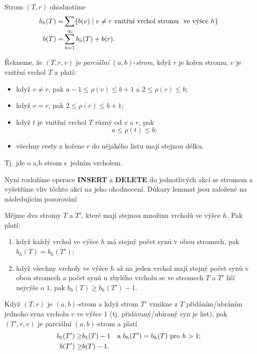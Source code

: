 \documentclass[a4paper,12pt]{article}
\begin{document}
\begin{definice}
Strom $(T,r)$ ohodnotíme 
\begin{align*} b_h(T)=&\sum \{b(v)\mid v\ne r\text{\rm\ vnitřní vrchol stromu }\text{\rm\ ve výšce }
h\}\\
b(T)=&\sum_{h=1}^{\infty}b_h(T)+b(r).\end{align*}
\end{definice}

\begin{definice}

Řekneme, že $(T,r,v)$ je \emph{parciální} 
$(a,b)$-\emph{strom}, když $r$ je kořen stromu, $v$ je vnitřní 
vrchol $T$ a platí:
\begin{itemize}
\item
když $v\ne r$, pak $a-1\le\rho (v)\le b+1$ a $2\le\rho (r)\le 
b$;
\item
když $v=r$, pak $2\le\rho (r)\le b+1$;
\item
když $t$ je vnitřní vrchol $T$ různý od $v$ a $
r$, pak 
$$a\le\rho (t)\le b;$$
\item
všechny cesty z kořene $r$ do nějakého listu mají stejnou 
délku.
\end{itemize}
\end{definice}

Tj. jde o a,b strom s~jedním  vrcholem.

Nyní rozložíme operace {\bf INSERT} a {\bf DELETE} do 
jednotlivých akcí se stromem a vyšetří\-me vliv těchto 
akcí na jeho ohodnocení. Důkazy lemmat jsou 
založené na následujícím pozorování

\begin{pozorovani}[2]Mějme dva stromy $T$ a $T'$, které mají 
stejnou množinu vrcholů ve výšce $h$. Pak platí:
\begin{enumerate}
\item
když každý vrchol ve výšce $h$ má stejný počet synů 
v obou stromech, pak $b_h(T)=b_h(T')$;
\item
když všechny vrcholy ve výšce $h$ až na jeden vrchol mají stejný 
počet synů v obou stromech a počet synů u zby\-lé\-ho vrcholu se ve stromech $
T$ a $T'$ liší nejvýše o $1$, pak $b_h(T)\ge b_h(T')-
1$.
\end{enumerate}
\end{pozorovani}

\begin{lemma_counting}Když $(T,r)$ je $(a,b)$-strom a když strom $
T'$ 
vznikne z $T$ přidáním/ubráním jednoho syna vrcholu $
v$ 
ve výšce $1$ (tj. přidávaný/ubíraný syn je list), pak 
$(T',r,v)$ je parciální $(a,b)$-strom a platí 
\begin{align*} b_1(T')\ge&b_1(T)-1\quad\text{\rm a }b_h(T')=b_h(T)\text{\rm\ pro }
h>1;\\
b(T')\ge&b(T)-1.\end{align*}
\end{lemma_counting}
\end{document}
